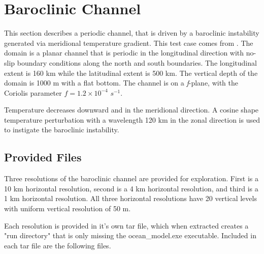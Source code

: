\section{Baroclinic Channel}
\label{sec:baroclinic_channel_description}
This section describes a periodic channel, that is driven by a baroclinic
instability generated via meridional temperature gradient. This test case comes from
\cite{Ilicak_ea12om}. The domain is a planar channel that is periodic in the
longitudinal direction with no-slip boundary conditions along the north and
south boundaries. The longitudinal extent is 160 km while the
latitudinal extent is 500 km. The vertical depth of the domain is 1000 m with a
flat bottom. The channel is on a {\it f}-plane, with the Coriolis parameter $f
= 1.2 \times 10^{-4}$ $s^{-1}$.

Temperature decreases downward and in the meridional direction. A cosine shape temperature
perturbation with a
wavelength 120 km in the zonal direction is used to instigate the baroclinic instability. 

\subsection{Provided Files}
\label{subsec:baroclinic_channel_files}
Three resolutions of the baroclinic channel are provided for exploration. First
is a 10 km horizontal resolution, second is a 4 km horizontal resolution, and
third is a 1 km horizontal resolution. All three horizontal resolutions have 20
vertical levels with uniform vertical resolution of 50 m.

Each resolution is provided in it's own tar file, which when extracted creates
a "run directory" that is only missing the ocean\_model.exe executable.
Included in each tar file are the following files.

